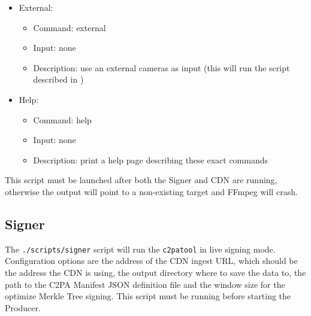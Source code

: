 \begin{itemize}
\begin{itemize}
    \end{itemize}
    \item External:
    \begin{itemize}
        \item Command: external
        \item Input: none
        \item Description: use an external cameras as input (this will run the script described in )
    \end{itemize}
    \item Help:
    \begin{itemize}
        \item Command: help
        \item Input: none
        \item Description: print a help page describing these exact commands 
    \end{itemize}
\end{itemize}

This script must be launched after both the Signer and CDN are running, otherwise the output will point to a non-existing target and FFmpeg will crash.

\subsection{Signer}

The \texttt{./scripts/signer} script will run the \texttt{c2patool} in live signing mode. Configuration options are the address of the CDN ingest URL, which should be the address the CDN is using, the output directory where to save the data to, the path to the C2PA Manifest JSON definition file and the window size for the optimize Merkle Tree signing. This script must be running before starting the Producer.

